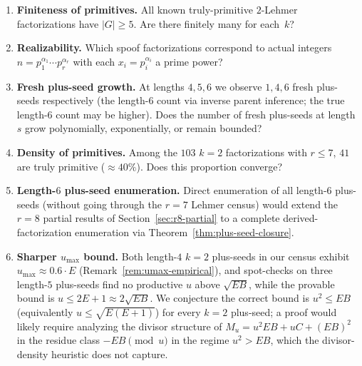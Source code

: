 \documentclass[11pt]{article}
\theoremstyle{definition}
\theoremstyle{remark}
\begin{document}
\begin{enumerate}[label=\arabic*.]
  \item \textbf{Finiteness of primitives.}  All known truly-primitive
    $2$-Lehmer factorizations have $|G| \ge 5$.  Are there finitely many
    for each~$k$?

  \item \textbf{Realizability.}  Which spoof factorizations correspond
    to actual integers $n = p_1^{\alpha_1} \cdots p_r^{\alpha_r}$ with
    each $x_i = p_i^{\alpha_i}$ a prime power?

  \item \textbf{Fresh plus-seed growth.}  At lengths $4, 5, 6$ we
    observe $1, 4, 6$ fresh plus-seeds respectively (the length-$6$
    count via inverse parent inference; the true length-$6$ count may
    be higher).  Does the number of fresh plus-seeds at length $s$
    grow polynomially, exponentially, or remain bounded?

  \item \textbf{Density of primitives.}  Among the $103$ $k = 2$
    factorizations with $r \le 7$, $41$ are truly primitive
    ($\approx 40\%$).  Does this proportion converge?

  \item \textbf{Length-$6$ plus-seed enumeration.}  Direct enumeration
    of all length-$6$ plus-seeds (without going through the $r = 7$
    Lehmer census) would extend the $r = 8$ partial results of
    Section~\ref{sec:r8-partial} to a complete derived-factorization
    enumeration via Theorem~\ref{thm:plus-seed-closure}.

  \item \textbf{Sharper $u_{\max}$ bound.}  Both length-$4$ $k = 2$
    plus-seeds in our census exhibit $u_{\max} \approx 0.6 \cdot E$
    (Remark~\ref{rem:umax-empirical}), and spot-checks on three
    length-$5$ plus-seeds find no productive $u$ above $\sqrt{EB}$,
    while the provable bound is $u \le 2E + 1 \approx 2 \sqrt{EB}$.
    We conjecture the correct bound is $u^2 \le EB$ (equivalently
    $u \le \sqrt{E(E+1)}$) for every $k = 2$ plus-seed; a proof
    would likely require analyzing the divisor structure of $M_u =
    u^2 EB + uC + (EB)^2$ in the residue class $-EB \pmod u$ in the
    regime $u^2 > EB$, which the divisor-density heuristic does not
    capture.
\end{enumerate}


\appendix

\end{document}
